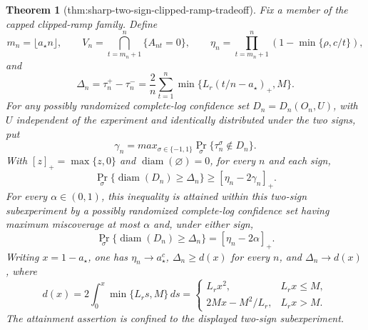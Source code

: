 \documentclass{article}
\newtheorem{theorem}{Theorem}
\begin{document}
\begin{theorem}[thm:sharp-two-sign-clipped-ramp-tradeoff]\label{thm:sharp-two-sign-clipped-ramp-tradeoff}
Fix a member of the capped clipped-ramp family. Define
\[
 m_n=\lfloor a_\star n\rfloor,
 \qquad
 V_n=\bigcap_{t=m_n+1}^{n}\{A_{nt}=0\},
 \qquad
 \eta_n=\prod_{t=m_n+1}^{n}\left(1-\min\{\rho,c/t\}\right),
\]
and
\[
 \Delta_n=\tau_n^+-\tau_n^-
 =\frac2n\sum_{t=1}^{n}\min\{L_r(t/n-a_\star)_+,M\}.
\]
For any possibly randomized complete-log confidence set \(D_n=D_n(O_n,U)\), with \(U\) independent of the experiment and identically distributed under the two signs, put
\[
 \gamma_n=max_{\sigma\in\{-1,1\}}
 \Pr_\sigma\{\tau_n^\sigma\notin D_n\}.
\]
With \([z]_+=\max\{z,0\}\) and \(\operatorname{diam}(\varnothing)=0\), for every \(n\) and each sign,
\[
 \Pr_\sigma\{\operatorname{diam}(D_n)\ge\Delta_n\}
 \ge[\eta_n-2\gamma_n]_+.
\]
For every \(\alpha\in(0,1)\), this inequality is attained within this two-sign subexperiment by a possibly randomized complete-log confidence set having maximum miscoverage at most \(\alpha\) and, under either sign,
\[
 \Pr_\sigma\{\operatorname{diam}(D_n)\ge\Delta_n\}
 =[\eta_n-2\alpha]_+.
\]
Writing \(x=1-a_\star\), one has \(\eta_n\to a_\star^c\), \(\Delta_n\ge d(x)\) for every \(n\), and \(\Delta_n\to d(x)\), where
\[
 d(x)=2\int_0^x\min\{L_rs,M\}\,ds
 =\begin{cases}
 L_rx^2,&L_rx\le M,\\
 2Mx-M^2/L_r,&L_rx>M.
 \end{cases}
\]
The attainment assertion is confined to the displayed two-sign subexperiment.
\end{theorem}
\end{document}
